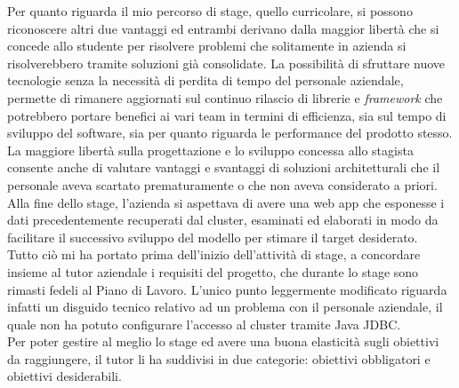 Per quanto riguarda il mio percorso di stage, quello curricolare, si possono riconoscere altri due vantaggi ed entrambi derivano dalla maggior libertà che si concede allo studente per risolvere problemi che solitamente in azienda si risolverebbero tramite soluzioni già consolidate. La possibilità di sfruttare nuove tecnologie senza la necessità di perdita di tempo del personale aziendale, permette di rimanere aggiornati sul continuo rilascio di librerie e \textit{framework} che potrebbero portare benefici ai vari team in termini di efficienza, sia sul tempo di sviluppo del software, sia per quanto riguarda le performance del prodotto stesso.
La maggiore libertà sulla progettazione e lo sviluppo concessa allo stagista consente anche di valutare vantaggi e svantaggi di soluzioni architetturali che il personale aveva scartato prematuramente o che non aveva considerato a priori.\\
Alla fine dello stage, l'azienda si aspettava di avere una \gls{web app} che esponesse i dati precedentemente recuperati dal \gls{cluster}, esaminati ed elaborati in modo da facilitare il successivo sviluppo del modello per stimare il target desiderato.\\
Tutto ciò mi ha portato prima dell'inizio dell'attività di stage, a concordare insieme al tutor aziendale i requisiti del progetto, che durante lo stage sono rimasti fedeli al Piano di Lavoro. L'unico punto leggermente modificato riguarda infatti un disguido tecnico relativo ad un problema con il personale aziendale, il quale non ha potuto configurare l'accesso al \gls{cluster} tramite \gls{Java JDBC}.\\
Per poter gestire al meglio lo stage ed avere una buona elasticità sugli obiettivi da raggiungere, il tutor li ha suddivisi in due categorie: obiettivi obbligatori e obiettivi desiderabili.

